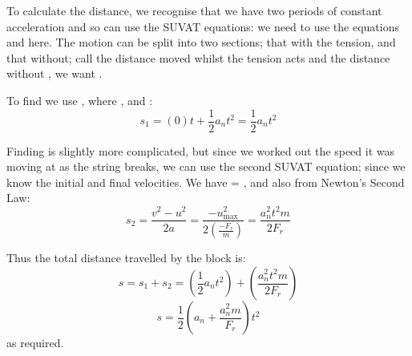 \begin{problem}[A1987PSIIQ9a]

To calculate the distance, we recognise that we have two periods of constant acceleration and so can use the SUVAT equations: we need to use the equations  and  here. The motion can be split into two sections; that with the tension, and that without; call the distance moved whilst the tension acts  and the distance without , we want .

To find  we use , where ,  and :
\begin{equation*} 
s_{1} = (0)t + \frac{1}{2} a_{n}t^{2} = \frac{1}{2} a_{n}t^{2} 
\end{equation*}

Finding  is slightly more complicated, but since we worked out the speed it was moving at as the string breaks, we can use the second SUVAT equation; since we know the initial and final velocities. We have  = ,  and also  from Newton's Second Law:
\begin{equation*}
 s_{2} = \frac{v^{2} - u^{2}}{2a} = \frac{- u_{\text{max}}^{2}}{2\left( \frac{-F_{r}}{m} \right)} = \frac{a_{n}^{2} t^{2} m}{2 F_{r}} 
 \end{equation*}

Thus the total distance travelled by the block is:
\begin{equation*} 
s = s_{1} + s_{2} = \left( \frac{1}{2}a_{n}t^2 \right) + \left( \frac{a_{n}^{2}t^{2}m}{2F_{r}} \right) 
\end{equation*}
\begin{equation*}
s = \frac{1}{2} \left(a_{n} + \frac{a_{n}^{2}m}{F_{r}} \right)t^{2}
\end{equation*}
as required.


\end{problem}
